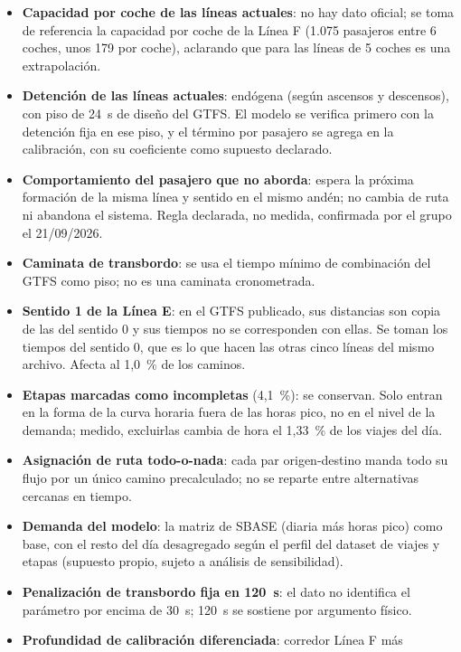 \documentclass{article}
\begin{document}
\begin{itemize}
  \item \textbf{Capacidad por coche de las líneas actuales}: no hay dato oficial;
    se toma de referencia la capacidad por coche de la Línea F (1.075 pasajeros
    entre 6 coches, unos 179 por coche), aclarando que para las líneas de 5 coches
    es una extrapolación.
  \item \textbf{Detención de las líneas actuales}: endógena (según ascensos y
    descensos), con piso de 24~s de diseño del GTFS. El modelo se verifica primero
    con la detención fija en ese piso, y el término por pasajero se agrega en la
    calibración, con su coeficiente como supuesto declarado.
  \item \textbf{Comportamiento del pasajero que no aborda}: espera la próxima
    formación de la misma línea y sentido en el mismo andén; no cambia de ruta ni
    abandona el sistema. Regla declarada, no medida, confirmada por el grupo el
    21/09/2026.
  \item \textbf{Caminata de transbordo}: se usa el tiempo mínimo de combinación del
    GTFS como piso; no es una caminata cronometrada.
  \item \textbf{Sentido 1 de la Línea E}: en el GTFS publicado, sus distancias son
    copia de las del sentido 0 y sus tiempos no se corresponden con ellas. Se toman
    los tiempos del sentido 0, que es lo que hacen las otras cinco líneas del mismo
    archivo. Afecta al 1,0~\% de los caminos.
  \item \textbf{Etapas marcadas como incompletas} (4,1~\%): se conservan. Solo
    entran en la forma de la curva horaria fuera de las horas pico, no en el nivel
    de la demanda; medido, excluirlas cambia de hora el 1,33~\% de los viajes del
    día.
  \item \textbf{Asignación de ruta todo-o-nada}: cada par origen-destino manda todo
    su flujo por un único camino precalculado; no se reparte entre alternativas
    cercanas en tiempo.
  \item \textbf{Demanda del modelo}: la matriz de SBASE (diaria más horas pico) como
    base, con el resto del día desagregado según el perfil del dataset de viajes y
    etapas (supuesto propio, sujeto a análisis de sensibilidad).
  \item \textbf{Penalización de transbordo fija en 120~s}: el dato no identifica el
    parámetro por encima de 30~s; 120~s se sostiene por argumento físico.
  \item \textbf{Profundidad de calibración diferenciada}: corredor Línea F más

\end{itemize}
\end{document}
